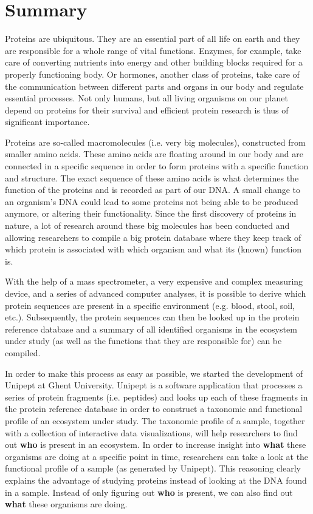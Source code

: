 \chapter*{Summary}

Proteins are ubiquitous.
They are an essential part of all life on earth and they are responsible for a whole range of vital functions.
Enzymes, for example, take care of converting nutrients into energy and other building blocks required for a properly functioning body.
Or hormones, another class of proteins, take care of the communication between different parts and organs in our body and regulate essential processes.
Not only humans, but all living organisms on our planet depend on proteins for their survival and efficient protein research is thus of significant importance.

Proteins are so-called macromolecules (i.e. very big molecules), constructed from smaller amino acids.
These amino acids are floating around in our body and are connected in a specific sequence in order to form proteins with a specific function and structure.
The exact sequence of these amino acids is what determines the function of the proteins and is recorded as part of our DNA.
A small change to an organism's DNA could lead to some proteins not being able to be produced anymore, or altering their functionality.
Since the first discovery of proteins in nature, a lot of research around these big molecules has been conducted and allowing researchers to compile a big protein database where they keep track of which protein is associated with which organism and what its (known) function is.

With the help of a mass spectrometer, a very expensive and complex measuring device, and a series of advanced computer analyses, it is possible to derive which protein sequences are present in a specific environment (e.g. blood, stool, soil, etc.).
Subsequently, the protein sequences can then be looked up in the protein reference database and a summary of all identified organisms in the ecosystem under study (as well as the functions that they are responsible for) can be compiled.

In order to make this process as easy as possible, we started the development of Unipept at Ghent University.
Unipept is a software application that processes a series of protein fragments (i.e. peptides) and looks up each of these fragments in the protein reference database in order to construct a taxonomic and functional profile of an ecosystem under study.
The taxonomic profile of a sample, together with a collection of interactive data visualizations, will help researchers to find out \textbf{who} is present in an ecosystem.
In order to increase insight into \textbf{what} these organisms are doing at a specific point in time, researchers can take a look at the functional profile of a sample (as generated by Unipept).
This reasoning clearly explains the advantage of studying proteins instead of looking at the DNA found in a sample.
Instead of only figuring out \textbf{who} is present, we can also find out \textbf{what} these organisms are doing.

